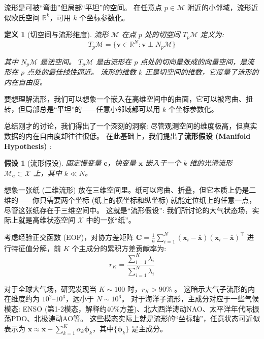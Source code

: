 \documentclass[12pt, a4paper]{article}
\newtheorem{assumption}{假设}[section]
\newtheorem{definition}{定义}[section]
\newcommand{\R}{\mathbb{R}}
\newcommand{\manifold}{\mathcal{M}}
\newcommand{\dataspace}{\mathcal{X}}
\newcommand{\fastvar}{\bm{x}}          %
\newcommand{\slowvar}{\bm{c}}          %
\newcommand{\eigenval}{\lambda}         %
\newcommand{\manifolddim}{k}            %
\newcommand{\mode}{\bm{\phi}}           %
\begin{document}
流形是可被“弯曲”但局部“平坦”的空间。
在任意点 $p \in \manifold$ 附近的小邻域，流形近似欧氏空间 $\R^k$，可用 $k$ 个坐标参数化。

\begin{definition}[切空间与流形维度]
\label{def:tangent_space}
    流形 $\manifold$ 在点 $p$ 处的切空间 $T_p\manifold$ 定义为:
    \begin{equation}
    \label{eq:tangent_space}
        T_p\manifold = \{\bm{v} \in \R^N : \bm{v} \perp N_p\manifold\}
    \end{equation}

    其中 $N_p\manifold$ 是法空间。
    $T_p\manifold$ 是由流形在 $p$ 点处的切向量张成的向量空间，是流形在 $p$ 点处的最佳线性逼近。
    流形的维数 $k$ 正是切空间的维数，它度量了流形的内在自由度。
\end{definition}

要想理解流形，我们可以想象一个嵌入在高维空间中的曲面，它可以被弯曲、扭转，但局部总是“平坦”的——任意小邻域都可以用 $k$ 个坐标参数化。

总结刚才的讨论，我们得出了一个深刻的洞察: 尽管观测空间的维度极高，但真实数据的内在自由度却往往很低。
在此基础上，我们提出了\textbf{流形假设 (Manifold Hypothesis)} \cite{fefferman2016testing}:

\begin{assumption}[流形假设]
\label{ass:manifold_hypothesis}
    固定慢变量 $\slowvar$，快变量 $\fastvar$ 嵌入于一个 $\manifolddim$ 维的光滑流形 $\manifold_{\slowvar} \subset \dataspace$ 上，其中 $\manifolddim \ll N$。
\end{assumption}

想象一张纸 (二维流形) 放在三维空间里。纸可以弯曲、折叠，但它本质上仍是二维的——你只需要两个坐标 (纸上的横坐标和纵坐标) 就能定位纸上的任意一点，尽管这张纸存在于三维空间中。
这就是“流形假设”: 我们所讨论的大气状态场，实际上就是高维状态空间 $\dataspace$ 中的一张“纸”。

考虑经验正交函数 (EOF)，对协方差矩阵 $\bm{C} = \frac{1}{n}\sum_{i=1}^N (\fastvar_i - \bar{\fastvar})(\fastvar_i - \bar{\fastvar})^\top$ 进行特征值分解，前 $K$ 个主成分的累积方差贡献率为:
\begin{equation}
\label{eq:eof_variance_contribution}
    r_K = \frac{\sum_{i=1}^K \eigenval_i}{\sum_{i=1}^N \eigenval_i}
\end{equation}

对于全球大气场，研究发现当 $K \sim 100$ 时，$r_K > 90\%$ \cite{hasselmann1988pips}。
这暗示大气子流形的内在维度约为 $10^2 \text{--} 10^3$，远小于 $N \sim 10^6$。
对于海洋子流形，主成分对应于一些气候模态: ENSO (第1-2模态，解释约40\%方差)、北大西洋涛动NAO、太平洋年代际振荡PDO、北极涛动AO等。
这些模态实际上就是流形的“坐标轴”，任意状态可近似表示为 $\fastvar \approx \bar{\fastvar} + \sum_{k=1}^K \alpha_k \mode_k$，其中$\{\mode_k\}$ 是主成分。
\end{document}
